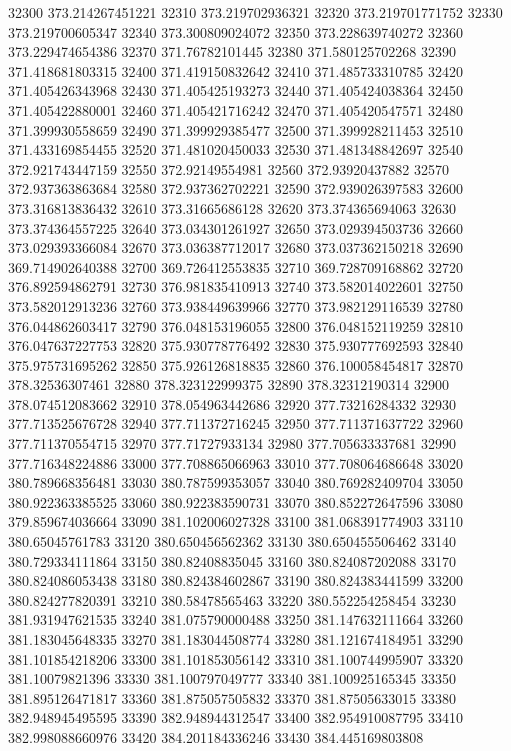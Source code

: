 {32300 373.214267451221
32310 373.219702936321
32320 373.219701771752
32330 373.219700605347
32340 373.300809024072
32350 373.228639740272
32360 373.229474654386
32370 371.76782101445
32380 371.580125702268
32390 371.418681803315
32400 371.419150832642
32410 371.485733310785
32420 371.405426343968
32430 371.405425193273
32440 371.405424038364
32450 371.405422880001
32460 371.405421716242
32470 371.405420547571
32480 371.399930558659
32490 371.399929385477
32500 371.399928211453
32510 371.433169854455
32520 371.481020450033
32530 371.481348842697
32540 372.921743447159
32550 372.92149554981
32560 372.93920437882
32570 372.937363863684
32580 372.937362702221
32590 372.939026397583
32600 373.316813836432
32610 373.31665686128
32620 373.374365694063
32630 373.374364557225
32640 373.034301261927
32650 373.029394503736
32660 373.029393366084
32670 373.036387712017
32680 373.037362150218
32690 369.714902640388
32700 369.726412553835
32710 369.728709168862
32720 376.892594862791
32730 376.981835410913
32740 373.582014022601
32750 373.582012913236
32760 373.938449639966
32770 373.982129116539
32780 376.044862603417
32790 376.048153196055
32800 376.048152119259
32810 376.047637227753
32820 375.930778776492
32830 375.930777692593
32840 375.975731695262
32850 375.926126818835
32860 376.100058454817
32870 378.32536307461
32880 378.323122999375
32890 378.32312190314
32900 378.074512083662
32910 378.054963442686
32920 377.73216284332
32930 377.713525676728
32940 377.711372716245
32950 377.711371637722
32960 377.711370554715
32970 377.71727933134
32980 377.705633337681
32990 377.716348224886
33000 377.708865066963
33010 377.708064686648
33020 380.789668356481
33030 380.787599353057
33040 380.769282409704
33050 380.922363385525
33060 380.922383590731
33070 380.852272647596
33080 379.859674036664
33090 381.102006027328
33100 381.068391774903
33110 380.65045761783
33120 380.650456562362
33130 380.650455506462
33140 380.729334111864
33150 380.82408835045
33160 380.824087202088
33170 380.824086053438
33180 380.824384602867
33190 380.824383441599
33200 380.824277820391
33210 380.58478565463
33220 380.552254258454
33230 381.931947621535
33240 381.075790000488
33250 381.147632111664
33260 381.183045648335
33270 381.183044508774
33280 381.121674184951
33290 381.101854218206
33300 381.101853056142
33310 381.100744995907
33320 381.10079821396
33330 381.100797049777
33340 381.100925165345
33350 381.895126471817
33360 381.875057505832
33370 381.87505633015
33380 382.948945495595
33390 382.948944312547
33400 382.954910087795
33410 382.998088660976
33420 384.201184336246
33430 384.445169803808
}

